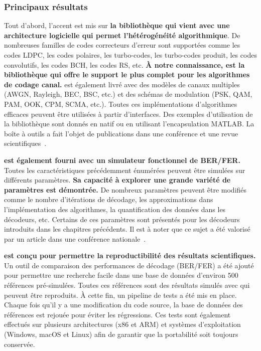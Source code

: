 \subsubsection*{Principaux résultats}

Tout d'abord, l'accent est mis sur \textbf{la bibliothèque \AFFECT qui vient
avec une architecture logicielle qui permet l'hétérogénéité algorithmique}. De
nombreuses familles de codes correcteurs d'erreur sont supportées comme les
codes LDPC, les codes polaires, les turbo-codes, les turbo-codes produit, les
codes convolutifs, les codes BCH, les codes RS, etc. \textbf{À notre
connaissance, \AFFECT est la bibliothèque qui offre le support le plus complet
pour les algorithmes de codage canal.} \AFFECT est également livré avec des
modèles de canaux multiples (AWGN, Rayleigh, BEC, BSC, etc.) et des schémas de
modulation (PSK, QAM, PAM, OOK, CPM, SCMA, etc.). Toutes ces implémentations
d'algorithmes efficaces peuvent être utilisées à partir d'interfaces. Des
exemples d'utilisation de la bibliothèque sont donnés en \Cxx natif ou en
utilisant l'encapsulation MATLAB\R. La boîte à outils \AFFECT a fait l'objet de
publications dans une conférence et une revue scientifiques~\cite{Cassagne2017a,
Cassagne2019a}.

\textbf{\AFFECT est également fourni avec un simulateur fonctionnel de BER/FER.}
Toutes les caractéristiques précédemment énumérées peuvent être simulées sur
différents paramètres. \textbf{Sa capacité à explorer une grande variété de
paramètres est démontrée.} De nombreux paramètres peuvent être modifiés comme le
nombre d'itérations de décodage, les approximations dans l'implémentation des
algorithmes, la quantification des données dans les décodeurs, etc. Certains de
ces paramètres sont présentés pour les décodeurs introduits dans les chapitres
précédents. Il est à noter que ce sujet a été valorisé par un article dans une
conférence nationale~\cite{Cassagne2017}.

\textbf{\AFFECT est conçu pour permettre la reproductibilité des résultats
scientifiques.} Un outil de comparaison des performances de décodage (BER/FER) a
été ajouté pour permettre une recherche facile dans une base de données
d'environ 500 références pré-simulées. Toutes ces références sont des résultats
simulés avec \AFFECT qui peuvent être reproduits. À cette fin, un pipeline de
tests a été mis en place. Chaque fois qu'il y a une modification du code source,
la base de données des références est rejouée pour éviter les régressions. Ces
tests sont également effectués sur plusieurs architectures (x86 et ARM\R) et
systèmes d'exploitation (Windows, macOS et Linux) afin de garantir que la
portabilité soit toujours conservée.

